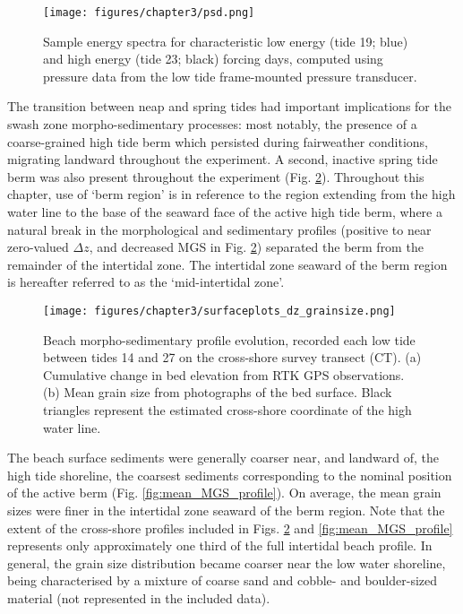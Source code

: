 \begin{figure}[tbp] %
	\begin{center}
	\texttt{[image: figures/chapter3/psd.png]}
	\caption[Energy spectra for high and low energy wave forcing]{Sample energy spectra for characteristic low energy (tide 19; blue) and high energy (tide 23; black) forcing days, computed using pressure data from the low tide frame-mounted pressure transducer.}
	\label{fig:psd}
	\end{center}
\end{figure}

The transition between neap and spring tides had important implications for the swash zone morpho-sedimentary processes: most notably, the presence of a coarse-grained high tide berm which persisted during fairweather conditions, migrating landward throughout the experiment. A second, inactive spring tide berm was also present throughout the experiment (Fig. \ref{fig:alltides_profiles}). Throughout this chapter, use of `berm region' is in reference to the region extending from the high water line to the base of the seaward face of the active high tide berm, where a natural break in the morphological and sedimentary profiles (positive to near zero-valued $\Delta z$, and decreased MGS in Fig. \ref{fig:alltides_profiles}) separated the berm from the remainder of the intertidal zone. The intertidal zone seaward of the berm region is hereafter referred to as the `mid-intertidal zone'.

\begin{figure}[tbp] %
  	\texttt{[image: figures/chapter3/surfaceplots\_dz\_grainsize.png]}
 	\caption[Surface plots of bed level change and mean grain size by tide]{Beach morpho-sedimentary profile evolution, recorded each low tide between tides 14 and 27 on the cross-shore survey transect (CT). (a) Cumulative change in bed elevation from RTK GPS observations. (b) Mean grain size from photographs of the bed surface. Black triangles represent the estimated cross-shore coordinate of the high water line.}
 	\label{fig:alltides_profiles}
\end{figure}

The beach surface sediments were generally coarser near, and landward of, the high tide shoreline, the coarsest sediments corresponding to the nominal position of the active berm (Fig. \ref{fig:mean_MGS_profile}). On average, the mean grain sizes were finer in the intertidal zone seaward of the berm region. Note that the extent of the cross-shore profiles included in Figs. \ref{fig:alltides_profiles} and \ref{fig:mean_MGS_profile} represents only approximately one third of the full intertidal beach profile. In general, the grain size distribution became coarser near the low water shoreline, being characterised by a mixture of coarse sand and cobble- and boulder-sized material (not represented in the included data). 

